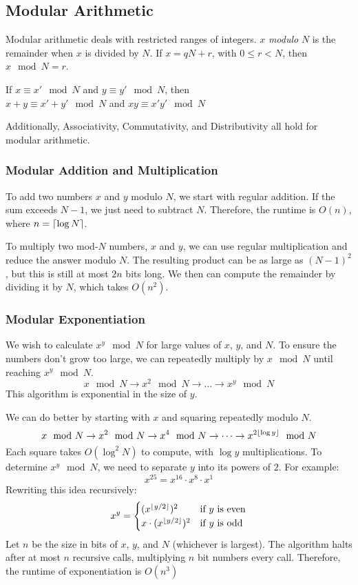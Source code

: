 \subsection{Modular Arithmetic}
Modular arithmetic deals with restricted ranges of integers. 
$x$ \emph{modulo} $N$ is the remainder when $x$ is divided by $N$. 
If $x = qN + r$, with $0 \leq r < N$, then $x \mod{N} = r$.
\begin{prop}
  If $x \equiv x' \mod{N}$ and $y \equiv y' \mod{N}$, then \\
  $x + y \equiv x' + y' \mod{N}$ and $xy \equiv x'y' \mod{N}$
\end{prop}
Additionally, Associativity, Commutativity, and Distributivity all hold for modular arithmetic.

\subsubsection{Modular Addition and Multiplication}
To add two numbers $x$ and $y$ modulo $N$, we start with regular addition.
If the sum exceeds $N-1$, we just need to subtract $N$. 
Therefore, the runtime is $O(n)$, where $n = \left\lceil{\log N}\right\rceil$.\par
To multiply two mod-$N$ numbers, $x$ and $y$, we can use regular multiplication and reduce the answer modulo $N$.
The resulting product can be as large as $(N-1)^2$, but this is still at most $2n$ bits long.
We then can compute the remainder by dividing it by $N$, which takes $O(n^2)$.

\subsubsection{Modular Exponentiation}
We wish to calculate $x^y \mod{N}$ for large values of $x$, $y$, and $N$.
To ensure the numbers don't grow too large, we can repeatedly multiply by $x \mod{N}$ until reaching $x^y \mod{N}$.
\[x \mod{N} \rightarrow x^2 \mod{N} \rightarrow \dots \rightarrow x^y \mod N\]
This algorithm is exponential in the size of $y$. \par
We can do better by starting with $x$ and squaring repeatedly modulo $N$.
\[x \mod{N} \rightarrow x^2 \mod{N} \rightarrow x^4 \mod N \rightarrow \dots \rightarrow x^{2 \left\lfloor{\log y}\right\rfloor} \mod N\]
Each square takes $O(\log^2 N)$ to compute, with $\log y$ multiplications.
To determine $x^y \mod N$, we need to separate $y$ into its powers of $2$.
For example:
\[x^{25} = x^{16} \cdot x^8 \cdot x^1\]
Rewriting this idea recursively:
\[ x^y = 
\begin{cases}
  (x^{\left\lfloor{y/2}\right\rfloor})^2 & \text{if $y$ is even} \\
  x \cdot (x^{\left\lfloor{y/2}\right\rfloor})^2 & \text{if $y$ is odd} \\
\end{cases}
\]
Let $n$ be the size in bits of $x$, $y$, and $N$ (whichever is largest).
The algorithm halts after at most $n$ recursive calls, multiplying $n$ bit numbers every call.
Therefore, the runtime of exponentiation is $O(n^3)$

